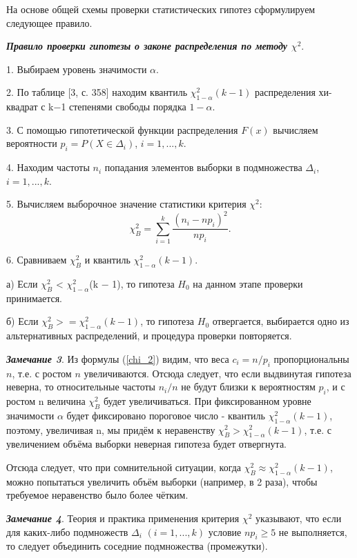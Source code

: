 \documentclass[12pt]{article}
\begin{document}
	На основе общей схемы проверки статистических гипотез сформулируем следующее правило.
	
	\textbf{\textit{Правило проверки гипотезы о законе распределения по методу $\chi^{2}$}}.
	
	1. Выбираем уровень значимости $\alpha$.
	
	2. По таблице [3, с. 358] находим квантиль $\chi^{2}_{1-\alpha}(k - 1)$ распределения хи-квадрат с k$-$1 степенями свободы порядка $1-\alpha$. 
	
	3. С помощью гипотетической функции распределения $F(x)$ вычисляем вероятности $p_{i} = P (X \in \Delta_{i})$, $i = 1, ... ,k$.
	
	4. Находим частоты $n_{i}$ попадания элементов выборки в подмножества $\Delta_{i}$, $i = 1, ... ,k$. 
	
	5. Вычисляем выборочное значение статистики критерия $\chi^{2}$:
	\begin{equation}
		\chi^{2}_{B} =\sum_{i = 1}^{k}{\frac{(n_{i} - np_{i})^{2}}{np_{i}}}.
		\label{chi_B}
	\end{equation}
	
	6. Сравниваем $\chi^{2}_{B}$ и квантиль $\chi^{2}_{1-\alpha}(k-1)$.
	
	а) Если $\chi^{2}_{B}$ < $\chi^{2}_{1-\alpha}$(k $-$ 1), то гипотеза $H_{0}$ на данном этапе проверки принимается. 
	
	б) Если $\chi^{2}_{B} >= \chi^{2}_{1-\alpha}(k -1)$, то гипотеза $H_{0}$ отвергается, выбирается одно из альтернативных распределений, и процедура проверки повторяется.
	
	\textbf{\textit{Замечание 3}}. Из формулы (\ref{chi_2}) видим, что веса $c_i = n/p_{i}$ пропорциональны $n$, т.е. с ростом $n$ увеличиваются. Отсюда следует, что если выдвинутая гипотеза неверна, то относительные частоты $n_{i}/n$ не будут близки к вероятностям $p_{i}$, и с ростом n величина  $\chi^{2}_{B}$  будет увеличиваться. При фиксированном уровне значимости $\alpha$ будет фиксировано пороговое число - квантиль $\chi^{2}_{1-\alpha}(k-1)$, поэтому, увеличивая n, мы придём к неравенству $\chi^{2}_{B} > \chi^{2}_{1-\alpha}(k-1)$, т.е. с увеличением объёма выборки неверная гипотеза будет отвергнута.
	
	Отсюда следует, что при сомнительной ситуации, когда $\chi^{2}_{B} \approx \chi^{2}_{1-\alpha}(k-1)$, можно попытаться увеличить объём выборки (например, в 2 раза), чтобы требуемое неравенство было более чётким.
	
	\textbf{\textit{Замечание 4}}. Теория и практика применения критерия  $\chi^{2}$ указывают, что если для каких-либо подмножеств $\Delta_{i}$ $(i = 1, ... ,k)$ условие $np_{i} \geq 5$ не выполняется, то следует объединить соседние подмножества (промежутки).
	
\end{document}
